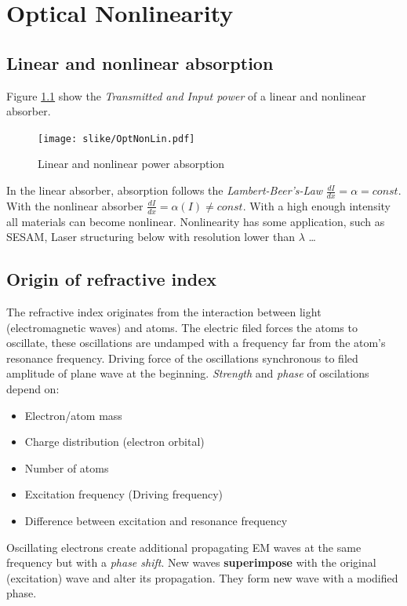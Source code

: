 \chapter{Optical Nonlinearity}

\section{Linear and nonlinear absorption}

Figure \ref{fig:linnonlinabsPP} show the \textit{Transmitted and Input power} of a 
linear and nonlinear absorber.

\begin{figure}[h!]
    \centering
    \texttt{[image: slike/OptNonLin.pdf]}
    \caption{Linear and nonlinear power absorption}
    \label{fig:linnonlinabsPP}
\end{figure}

In the linear absorber, absorption follows the \textit{Lambert-Beer's-Law} \pd $\frac{dI}{dx} = \alpha = const$. With 
the nonlinear absorber \pd $\frac{dI}{dx} = \alpha(I) \ne const $. With a high enough intensity all materials can become 
nonlinear. Nonlinearity has some application, such as SESAM, Laser structuring below with resolution lower than $\lambda$ \dots

\section{Origin of refractive index}
The refractive index originates from the interaction between
light (electromagnetic waves) and atoms. The electric filed forces the
atoms to oscillate, these oscillations are undamped with a frequency far 
from the atom's resonance frequency. 
Driving force of the oscillations synchronous to filed amplitude of
plane wave at the beginning. \textit{Strength} and \textit{phase} of oscilations 
depend on:
\begin{itemize}
    \item Electron/atom mass
    \item Charge distribution (electron orbital)
    \item Number of atoms
    \item Excitation frequency (Driving frequency)
    \item Difference between excitation and resonance frequency
\end{itemize}

Oscillating electrons create additional propagating EM waves at the same frequency 
but with a \textit{phase shift}. New waves \textbf{superimpose} with the original (excitation) wave and 
alter its propagation. They form new wave with a modified phase.

